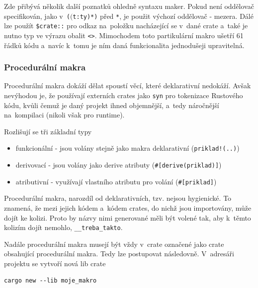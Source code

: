 \documentclass[a4paper, 12pt]{article} %
\newcommand{\rust}[1]{\texttt{#1}}
\begin{document}
            Zde přibývá několik další poznatků ohledně syntaxu maker. Pokud není oddělovač specifikován, jako v~\rust{($($t:ty)*)} před \rust{*}, je použit výchozí oddělovač - mezera. Dálé lze použít \texttt{\$crate::} pro odkaz na~položku nacházející se v~dané crate a~také je nutno typ ve výrazu obalit \rust{<>}. Mimochodem toto partikulární makro ušetří 61 řádků kódu a~navíc k~tomu je ním daná funkcionalita jednodušeji upravitelná.\cite{dekl_makra}

        \subsubsection*{Procedurální makra}
            Procedurální makra dokáží dělat spoustí věcí, které deklarativní nedokáží. Avšak nevýhodou je, že používají externích crates jako \rust{syn} pro tokenizace Rustového kódu, kvůli čemuž je daný projekt ihned objemnější, a~tedy náročnější na~kompilaci (nikoli však pro runtime).
            
            Rozlišují se tři základní typy
            \begin{itemize}
                \item funkcionální - jsou volány stejně jako makra deklarativní (\texttt{priklad!(..)})
                \item derivovací - jsou volány jako derive atributy (\texttt{\#[derive(priklad)]})
                \item atributivní - využívají vlastního atributu pro volání (\texttt{\#[priklad]})
            \end{itemize}
            
            Procedurální makra, narozdíl od deklarativních, tzv. nejsou hygienické. To znamená, že mezi jejich kódem a~kódem crates, do nichž jsou importovány, může dojít ke kolizi. Proto by názvy nimi generované měli být volené tak, aby k~těmto kolizím dojít nemohlo, \rust{__treba_takto}.
            
            Nadále procedurální makra musejí být vždy v~crate označené jako crate obsahující procedurální makra. Tedy lze postupovat následovně. V~adresáři projektu se vytvoří nová lib crate
            \begin{verbatim}
cargo new --lib moje_makro
            \end{verbatim}
            
\end{document}
